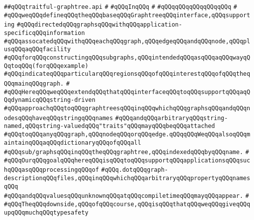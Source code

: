 \label{src/lib/std/graphtree/traitful-graphtree.api}
\verb|##qQQqtraitful-graphtree.api|\newline
\verb|#|\newline
\verb|#qQQqInqQQq|\newline
\verb|#|\newline
\verb|#qQQqqQQqqQQqqQQqqQQq|\newline
\verb|#|\newline
\verb|#qQQqweqQQqdefineqQQqtheqQQqbaseqQQqGraphtreeqQQqinterface,qQQqsupporting|\newline
\verb|#qQQqdirectedqQQqgraphsqQQqwithqQQqapplication-specificqQQqinformation|\newline
\verb|#qQQqassocatedqQQqwithqQQqeachqQQqgraph,qQQqedgeqQQqandqQQqnode,qQQqplusqQQqaqQQqfacility|\newline
\verb|#qQQqforqQQqconstructingqQQqsubgraphs,qQQqintendedqQQqasqQQqaqQQqwayqQQqtoqQQq(forqQQqexample)|\newline
\verb|#qQQqindicateqQQqparticularqQQqregionsqQQqofqQQqinterestqQQqofqQQqtheqQQqmainqQQqgraph.|\newline
\verb|#|\newline
\verb|#qQQqHereqQQqweqQQqextendqQQqthatqQQqinterfaceqQQqtoqQQqsupportqQQqaqQQqdynamicqQQqstring-driven|\newline
\verb|#qQQqapproachqQQqtoqQQqgraphtreesqQQqinqQQqwhichqQQqgraphsqQQqandqQQqnodesqQQqhaveqQQqstringqQQqnames|\newline
\verb|#qQQqandqQQqarbitraryqQQqstring-named,qQQqstring-valuedqQQq"traits"qQQqmayqQQqbeqQQqattached|\newline
\verb|#qQQqtoqQQqanyqQQqgraph,qQQqnodeqQQqorqQQqedge.qQQqqQQqWeqQQqalsoqQQqmaintainqQQqaqQQqdictionaryqQQqofqQQqall|\newline
\verb|#qQQqsub/graphsqQQqinqQQqtheqQQqgraphtree,qQQqindexedqQQqbyqQQqname.|\newline
\verb|#|\newline
\verb|#qQQqOurqQQqgoalqQQqhereqQQqisqQQqtoqQQqsupportqQQqapplicationsqQQqsuchqQQqasqQQqprocessingqQQqof|\newline
\verb|#qQQq.dotqQQqgraph-descriptionqQQqfiles,qQQqinqQQqwhichqQQqarbitraryqQQqpropertyqQQqnamesqQQq|\newline
\verb|#qQQqandqQQqvaluesqQQqunknownqQQqatqQQqcompiletimeqQQqmayqQQqappear.|\newline
\verb|#|\newline
\verb|#qQQqTheqQQqdownside,qQQqofqQQqcourse,qQQqisqQQqthatqQQqweqQQqgiveqQQqupqQQqmuchqQQqtypesafety|\newline
